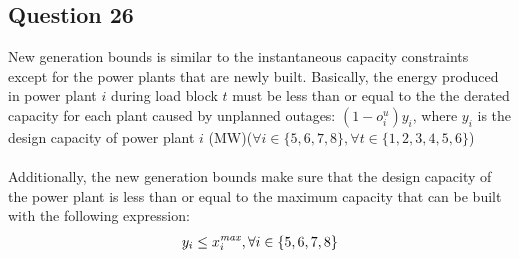 \documentclass[11pt,a4paper]{article}
\begin{document}
\subsection*{Question 26}
New generation bounds is similar to the instantaneous capacity constraints except for the power plants that are newly built. Basically, the energy produced in power plant $i$ during load block $t$ must be less than or equal to the the derated capacity for each plant caused by unplanned outages: $(1-o_{i}^{u})y_{i}$, where $y_{i}$ is the design capacity of power plant $i$ (MW)($\forall i \in{} \{5,6,7,8\},  \forall t \in{} \{1,2,3,4,5,6\}$)\\
\\
Additionally, the new generation bounds make sure that the design capacity of the power plant is less than or equal to the maximum capacity that can be built with the following expression:
\begin{align*}
	y_{i} \leq x_{i}^{\text{\textit{max}}}, \forall i \in{} \{5,6,7,8\}
\end{align*}
\end{document}
